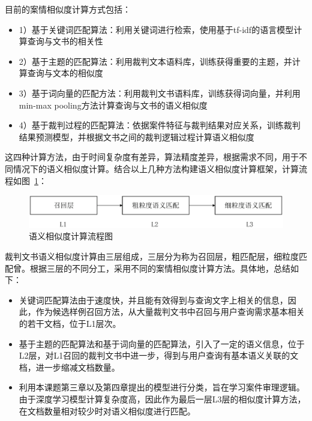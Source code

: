 目前的案情相似度计算方式包括：
\begin{itemize}
    \item 1）基于关键词匹配算法：利用关键词进行检索，使用基于tf-idf的语言模型计算查询与文书的相关性
    \item 2）基于主题的匹配算法：利用裁判文本语料库，训练获得重要的主题，并计算查询与文本的相似度
    \item 3）基于词向量的匹配方法：利用裁判文书语料库，训练获得词向量，并利用min-max pooling方法计算查询与文书的语义相似度
    \item 4）基于裁判过程的匹配算法：依据案件特征与裁判结果对应关系，训练裁判结果预测模型，并根据文书之间的裁判逻辑过程计算语义相似度
\end{itemize}

这四种计算方法，由于时间复杂度有差异，算法精度差异，根据需求不同，用于不同情况下的语义相似度计算。结合以上几种方法构建语义相似度计算框架，计算流程如图~\ref{fig:sys_similarity2}：
\begin{figure}[htbp]%
    \centering
    \includegraphics[scale=0.5, clip=true]{./sources/sys_similarity2.eps}
    \caption{\label{fig:sys_similarity2}语义相似度计算流程图}
\end{figure}

裁判文书语义相似度计算由三层组成，三层分为称为召回层，粗匹配层，细粒度匹配曾。根据三层的不同分工，采用不同的案情相似度计算方法。具体地，总结如下：
\begin{itemize}
    \item 关键词匹配算法由于速度快，并且能有效得到与查询文字上相关的信息，因此，作为候选样例召回方法，从大量裁判文书中召回与用户查询需求基本相关的若干文档，位于L1层次。
    \item 基于主题的匹配算法和基于词向量的匹配算法，引入了一定的语义信息，位于L2层，对L1召回的裁判文书中进一步，得到与用户查询有基本语义关联的文档，进一步缩减文档数量。
    \item 利用本课题第三章以及第四章提出的模型进行分类，旨在学习案件审理逻辑。由于深度学习模型计算复杂度高，因此作为最后一层L3层的相似度计算方法，在文档数量相对较少时对语义相似度进行匹配。
\end{itemize}




